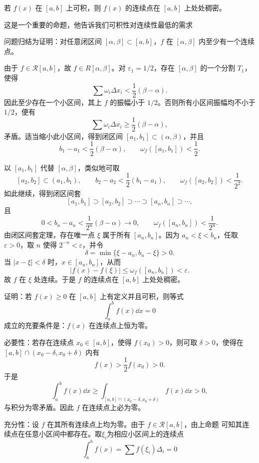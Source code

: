 \begin{proposition}
		若 $f(x)$ 在 $[a,b]$ 上可积，则 $f(x)$ 的连续点在 $[a,b]$ 上处处稠密。
\end{proposition}
这是一个重要的命题，他告诉我们可积性对连续性最低的需求
\begin{solution}
	问题归结为证明：对任意闭区间 $[\alpha,\beta]\subset[a,b]$，$f$ 在 $[\alpha,\beta]$ 内至少有一个连续点。
	
	由于 $f\in  \mathcal{R}[a,b]$，故 $f\in R[\alpha,\beta]$。对 $\varepsilon_1=1/2$，存在 $[\alpha,
	\beta]$ 的一个分割 $T_1$，使得
	\[
	\sum \omega_i\Delta x_i<\frac12(\beta-\alpha).
	\]
	因此至少存在一个小区间，其上 $f$ 的振幅小于 $1/2$。否则所有小区间振幅均不小于 $1/2$，便有
	\[
	\sum \omega_i\Delta x_i\geq \frac12(\beta-\alpha),
	\]
	矛盾。适当缩小此小区间，得到闭区间 $[a_1,b_1]\subset(\alpha,\beta)$，并且
	\[
	b_1-a_1<\frac12(\beta-\alpha),
	\qquad
	\omega_f([a_1,b_1])<\frac12.
	\]
	
	以 $[a_1,b_1]$ 代替 $[\alpha,\beta]$，类似地可取
	\[
	[a_2,b_2]\subset(a_1,b_1),
	\qquad
	b_2-a_2<\frac12(b_1-a_1),
	\qquad
	\omega_f([a_2,b_2])<\frac1{2^2}.
	\]
	如此继续，得到闭区间套
	\[
	[a_1,b_1]\supset[a_2,b_2]\supset\cdots\supset[a_n,b_n]\supset\cdots,
	\]
	且
	\[
	0<b_n-a_n<\frac1{2^n}(\beta-\alpha)\to0,
	\qquad
	\omega_f([a_n,b_n])<\frac1{2^n}.
	\]
	由闭区间套定理，存在唯一点 $\xi$ 属于所有 $[a_n,b_n]$。因为 $a_n<\xi<b_n$，任取 $\varepsilon>0$，取 $n$ 使得 $2^{-n}<\varepsilon$，并令
	\[
	\delta=\min\{\xi-a_n,b_n-\xi\}>0.
	\]
	当 $|x-\xi|<\delta$ 时，$x\in[a_n,b_n]$，从而
	\[
	|f(x)-f(\xi)|\leq \omega_f([a_n,b_n])<\varepsilon.
	\]
	故 $f$ 在 $\xi$ 处连续。于是 $f$ 的连续点在 $[a,b]$ 上处处稠密。
\end{solution}
\begin{example}\label{连续点位令}
	证明：若 $f(x)\geq0$ 在 $[a,b]$ 上有定义并且可积，则等式
	\[
	\int_a^b f(x)\dd x=0
	\]
	成立的充要条件是：$f(x)$ 在连续点上恒为零。
\end{example}
\begin{solution}
	必要性：若存在连续点 $x_0\in[a,b]$，使得 $f(x_0)>0$，则可取 $\delta>0$，使得在 $[a,b]\cap(x_0-\delta,x_0+\delta)$ 内有
	\[
	f(x)>\frac12 f(x_0)>0.
	\]
	于是
	\[
	\int_a^b f(x)\dd x\geq
	\int_{[a,b]\cap(x_0-\delta,x_0+\delta)} f(x)\dd x>0,
	\]
	与积分为零矛盾。因此 $f$ 在连续点上必为零。
	
	充分性：设 $f$ 在其所有连续点上均为零。由于 $f\in  \mathcal{R}[a,b]$，由上命题 可知其连续点在任意小区间中都存在。取$\xi_i$为相应小区间上的连续点
	\[\int_a^b f(x) = \sum f(\xi_i)\Delta_i = 0\]
\end{solution}
